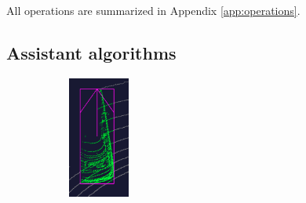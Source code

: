 \documentclass[letterpaper, 10 pt, conference]{ieeeconf}  %
\begin{document}
All operations are summarized in Appendix \ref{app:operations}.




\subsection{Assistant algorithms}
\begin{figure}[t]
	\centering

	\begin{subfigure}[t]{0.2\linewidth}
		\includegraphics[height=4cm]{./figures/points-enclosed}
		\caption{}


\end{subfigure}
\end{figure}
\end{document}
